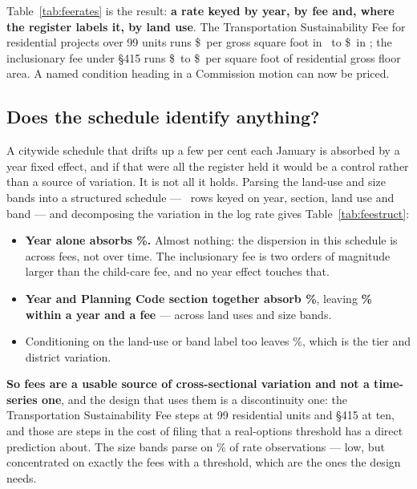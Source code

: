 \documentclass[11pt]{article}
\begin{document}
Table~\ref{tab:feerates} is the result: \textbf{a rate keyed by year, by fee and, where the
register labels it, by land use}. The Transportation Sustainability Fee for residential
projects over 99 units runs \$\acqTsfNinetyNineFirst\ per gross square foot in \acqFeeFirst\
to \$\acqTsfNinetyNineLast\ in \acqFeeLast; the inclusionary fee under \S415 runs
\$\acqInclusionaryFirst\ to \$\acqInclusionaryLast\ per square foot of residential gross floor
area. A named condition heading in a Commission motion can now be priced.

\subsection{Does the schedule identify anything?}
\label{sec:feeid}

A citywide schedule that drifts up a few per cent each January is absorbed by a year fixed
effect, and if that were all the register held it would be a control rather than a source of
variation. It is not all it holds. Parsing the land-use and size bands into a structured
schedule --- \acqFeeSchedRows\ rows keyed on year, section, land use and band --- and
decomposing the variation in the log rate gives Table~\ref{tab:feestruct}:

\begin{itemize}
\item \textbf{Year alone absorbs \acqFeeAbsYear\%.} Almost nothing: the dispersion in this
schedule is across fees, not over time. The inclusionary fee is two orders of magnitude larger
than the child-care fee, and no year effect touches that.
\item \textbf{Year and Planning Code section together absorb \acqFeeAbsYearSection\%},
leaving \textbf{\acqFeeWithin\% within a year and a fee} --- across land uses and size bands.
\item Conditioning on the land-use or band label too leaves \acqFeeWithinLabel\%, which is the
tier and district variation.
\end{itemize}

\textbf{So fees are a usable source of cross-sectional variation and not a time-series one},
and the design that uses them is a discontinuity one: the Transportation Sustainability Fee
steps at 99 residential units and \S415 at ten, and those are steps in the cost of filing that
a real-options threshold has a direct prediction about. The size bands parse on
\acqFeeBanded\% of rate observations --- low, but concentrated on exactly the fees with a
threshold, which are the ones the design needs.
\end{document}
